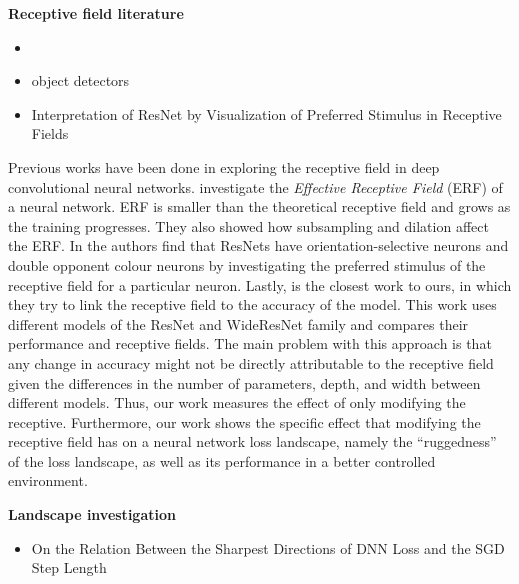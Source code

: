 \textbf{Receptive field literature}
\begin{itemize}
  \item \cite{luoUnderstandingEffectiveReceptive2016}
    \item object detectors \cite{zhouObjectDetectorsEmerge2015}
      \item Interpretation of ResNet by Visualization of Preferred Stimulus in Receptive Fields \cite{kobayashiInterpretationResNetVisualization2020}
\end{itemize}
 Previous works have been done in exploring the receptive field in deep convolutional neural networks.
 \cite{luoUnderstandingEffectiveReceptive2016}  investigate the \textit{Effective Receptive Field} (ERF) of a neural network. ERF is smaller than the theoretical receptive field and grows as the training progresses. They also showed how subsampling and dilation affect the ERF. In \cite{kobayashiInterpretationResNetVisualization2020} the authors find that ResNets have orientation-selective neurons and double opponent colour neurons by investigating the
 preferred stimulus of the receptive field for a particular neuron. Lastly, \citep{kimDeadPixelTest2023} is the closest work
to ours, in which they try to link the receptive field to the accuracy of the model. This work uses different models of the ResNet and WideResNet family and compares their performance and receptive fields. The main problem with this approach is that any change in accuracy might not be directly attributable to the receptive field given the differences in the number of parameters, depth, and width between different models. Thus, our work measures the effect of only modifying the receptive. Furthermore, our work shows the specific effect that modifying the receptive field has on a neural network loss landscape, namely the ``ruggedness'' of the loss landscape, as well as its performance in a better controlled environment.



\textbf{Landscape investigation}
\begin{itemize}
  \item On the Relation Between the Sharpest Directions of DNN Loss and the SGD Step Length \cite{jastrzebskiRelationSharpestDirections2019}
\end{itemize}
